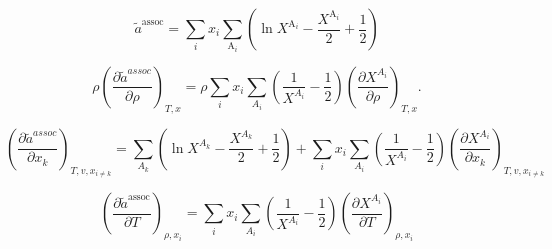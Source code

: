 \documentclass[12pt, letterpaper]{article}
\begin{document}
\begin{equation}
    \tilde{a}^{\mathrm{assoc}}= \sum_{i} x_{i}\sum_{\mathrm{A}_{i}}\left(\ln X^{\mathrm{A}_{i}}-\frac{X^{\mathrm{A}_{i}}}{2}+\frac{1}{2}\right)
    \label{eq:ares_assoc}
\end{equation}



\begin{equation}
    \rho\left(\frac{\partial\tilde{a}^{assoc}}{\partial\rho}\right)_{T,x}
    =\rho\sum_{i}x_{i}\sum_{A_{i}}\left(\frac{1}{X^{A_{i}}}-\frac{1}{2}\right)\left(\frac{\partial X^{A_{i}}}{\partial\rho}\right)_{T,x}.
    \label{eq:assoc_ares_dadrho}
\end{equation}


\begin{equation}
    \left(\frac{\partial \tilde a^{assoc}}{\partial x_{k}}\right)_{T,v,x_{i\neq k}}
    =
    \sum_{A_{k}}\left(\ln X^{A_{k}}-\frac{X^{A_{k}}}{2}+\frac{1}{2}\right)
    +
    \sum_{i} x_{i}\sum_{A_{i}}
    \left(\frac{1}{X^{A_{i}}}-\frac{1}{2}\right)
    \left(\frac{\partial X^{A_{i}}}{\partial x_{k}}\right)_{T,v,x_{i\neq k}}
    \label{eq:assoc_ares_dxk}
\end{equation}


\begin{equation}
    \left(\frac{\partial\tilde{a}^{\mathrm{assoc}}}{\partial T}\right)_{\rho,x_i}
    =
    \sum_i x_i \sum_{A_i}
    \left(\frac{1}{X^{A_i}}-\frac{1}{2}\right)
    \left(\frac{\partial X^{A_i}}{\partial T}\right)_{\rho,x_i}
    \label{eq:assoc_ares_dT}
\end{equation}
\end{document}
